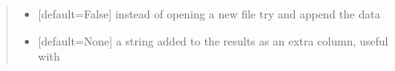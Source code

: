 \documentclass[letterpaper,12pt,english]{sphinxmanual}
\begin{document}
\begin{fulllineitems}
\begin{quote}
\begin{description}
\begin{itemize}
\item {} 
\sphinxAtStartPar
{} \textendash{} {[}default=False{]} instead of opening a new file try and append the data

\item {} 
\sphinxAtStartPar
{} \textendash{} {[}default=None{]} a string added to the results as an extra column, useful with 

\end{itemize}

\end{description}\end{quote}

\end{fulllineitems}
\end{document}
